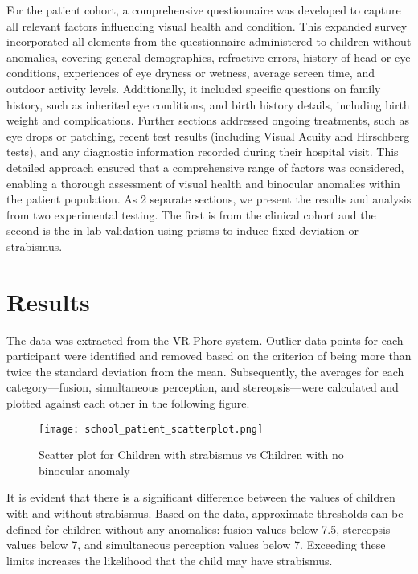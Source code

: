\documentclass{article}
\begin{document}
For the patient cohort, a comprehensive questionnaire was developed to capture all relevant factors influencing visual health and condition. This expanded survey incorporated all elements from the questionnaire administered to children without anomalies, covering general demographics, refractive errors, history of head or eye conditions, experiences of eye dryness or wetness, average screen time, and outdoor activity levels. Additionally, it included specific questions on family history, such as inherited eye conditions, and birth history details, including birth weight and complications. Further sections addressed ongoing treatments, such as eye drops or patching, recent test results (including Visual Acuity and Hirschberg tests), and any diagnostic information recorded during their hospital visit. This detailed approach ensured that a comprehensive range of factors was considered, enabling a thorough assessment of visual health and binocular anomalies within the patient population.
As 2 separate sections, we present the results and analysis from two experimental testing. The first is from the clinical cohort and the second is the in-lab validation using prisms to induce fixed deviation or strabismus. 

\section{Results}
The data was extracted from the VR-Phore system. Outlier data points for each participant were identified and removed based on the criterion of being more than twice the standard deviation from the mean. Subsequently, the averages for each category—fusion, simultaneous perception, and stereopsis—were calculated and plotted against each other in the following figure.

\begin{figure}[h!]
  \centering
  \texttt{[image: school\_patient\_scatterplot.png]}
  \caption{Scatter plot for Children with strabismus vs Children with no binocular anomaly}
  \label{fig:example}
\end{figure}

It is evident that there is a significant difference between the values of children with and without strabismus. Based on the data, approximate thresholds can be defined for children without any anomalies: fusion values below 7.5, stereopsis values below 7, and simultaneous perception values below 7. Exceeding these limits increases the likelihood that the child may have strabismus.
\end{document}
